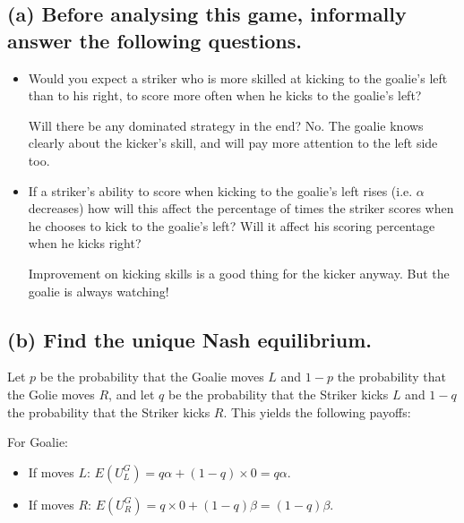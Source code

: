 \documentclass{article}
\begin{document}
\subsection*{(a) Before analysing this game, informally answer the following questions.}

\begin{itemize}
\item Would you expect a striker who is more skilled at kicking to the goalie's left than to his right, to score more often when he kicks to the goalie's left?

\begin{mdframed}[backgroundcolor=blue!20,linecolor=white]
Will there be any dominated strategy in the end? No. The goalie knows clearly about the kicker's skill, and will pay more attention to the left side too.


\end{mdframed}


\item If a striker's ability to score when kicking to the goalie's left rises (i.e. $\alpha$ decreases) how will this affect the percentage of times the striker scores when he chooses to kick to the goalie's left? Will it affect his scoring percentage when he kicks right?

\begin{mdframed}[backgroundcolor=blue!20,linecolor=white]
Improvement on kicking skills is a good thing for the kicker anyway. But the goalie is always watching!
\end{mdframed}

\end{itemize}




\subsection*{(b) Find the unique Nash equilibrium.}

Let $p$ be the probability that the Goalie moves $L$ and $1-p$ the probability that the Golie moves $R$, and let $q$ be the probability that the Striker kicks $L$ and $1-q$ the probability that the Striker kicks $R$. This yields the following payoffs:

\newpage

For Goalie:
\begin{itemize}
\item If moves $L$: $E(U^G_L)= q \alpha + (1-q) \times 0 = q \alpha$.
\item If moves $R$: $E(U^G_R)=q \times 0 + (1-q) \beta =(1-q) \beta$.
\end{itemize}
\end{document}
